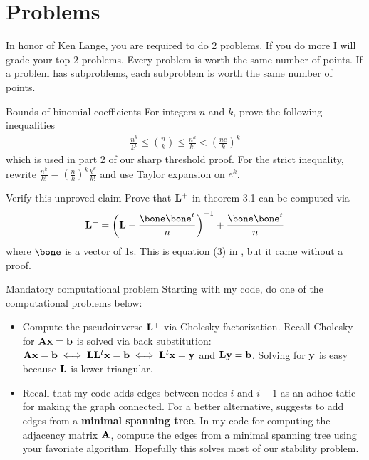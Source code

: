 \documentclass[./some_latex_template.tex]{subfiles}
\begin{document}
\section{Problems}

In honor of Ken Lange, you are required to do 2 problems. If you do more I will grade your top 2 problems. Every problem is worth the same number of points. If a problem has subproblems, each subproblem is worth the same number of points.

\begin{problembox}{Bounds of binomial coefficients}{}
For integers $n$ and $k$, prove the following inequalities
\begin{align*}
	\frac{n^k}{k^k} \le {n \choose k} \le \frac{n^k}{k!} < \left( \frac{ne}{k}\right)^k
\end{align*}
which is used in part 2 of our sharp threshold proof. For the strict inequality, rewrite $\frac{n^k}{k!} = \left(\frac{n}{k}\right)^k \frac{k^k}{k!}$ and use Taylor expansion on $e^k$.
\end{problembox}

\begin{problembox}{Verify this unproved claim}{}
Prove that $\mathbf{L}^+$ in theorem 3.1 can be computed via
\begin{align*}
	\bL^+ = \left(\bL - \frac{ \bone\bone^t }{n}\right)^{-1} + \frac{\bone\bone^t}{n}
\end{align*}
where $\bone$ is a vector of 1s. This is equation (3) in \cite{fouss2007random}, but it came without a proof.
\end{problembox}

\begin{problembox}{Mandatory computational problem}{}
Starting with my code, do one of the computational problems below: 
\begin{itemize}
	\item Compute the pseudoinverse $\mathbf{L}^+$ via Cholesky factorization. Recall Cholesky for $\mathbf{A}\mathbf{x} = \mathbf{b}$ is solved via back substitution: $\mathbf{A}\mathbf{x} = \mathbf{b} \iff \mathbf{L}\mathbf{L}^t\mathbf{x} = \mathbf{b} \iff \mathbf{L}^t\mathbf{x} = \mathbf{y}$ and $\mathbf{L}\mathbf{y} = \mathbf{b}$. Solving for $\mathbf{y}$ is easy because $\mathbf{L}$ is lower triangular. 
	\item Recall that my code adds edges between nodes $i$ and $i+1$ as an adhoc tatic for making the graph connected. For a better alternative, \cite{yen2005clustering} suggests to add edges from a \textbf{minimal spanning tree}. In my code for computing the adjacency matrix $\mathbf{A}$, compute the edges from a minimal spanning tree using your favoriate algorithm. Hopefully this solves most of our stability problem. 
\end{itemize}
\end{problembox}
\end{document}
